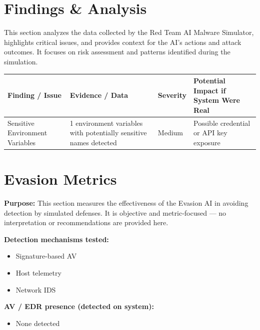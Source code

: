 \documentclass[a4paper,12pt]{article}
\begin{document}
\newpage


\section*{Findings \& Analysis}

This section analyzes the data collected by the Red Team AI Malware Simulator, highlights critical issues, and provides context for the AI’s actions and attack outcomes. It focuses on risk assessment and patterns identified during the simulation.

\begin{longtable}{|p{4cm}|p{6cm}|p{2cm}|p{3cm}|}
\hline
\textbf{Finding / Issue} & \textbf{Evidence / Data} & \textbf{Severity} & \textbf{Potential Impact if System Were Real} \\
\hline

Sensitive Environment Variables & 1 environment variables with potentially sensitive names detected & Medium & Possible credential or API key exposure \\
\hline

\end{longtable}

\newpage


\section*{Evasion Metrics}

\textbf{Purpose:} This section measures the effectiveness of the Evasion AI in avoiding detection by simulated defenses. It is objective and metric-focused — no interpretation or recommendations are provided here.

\vspace{0.3cm}
\textbf{Detection mechanisms tested:}
\begin{itemize}
    
        
            \item Signature-based AV
        
            \item Host telemetry
        
            \item Network IDS
        
    
\end{itemize}

\textbf{AV / EDR presence (detected on system):}
\begin{itemize}
    
        \item None detected
    
\end{itemize}
\end{document}
